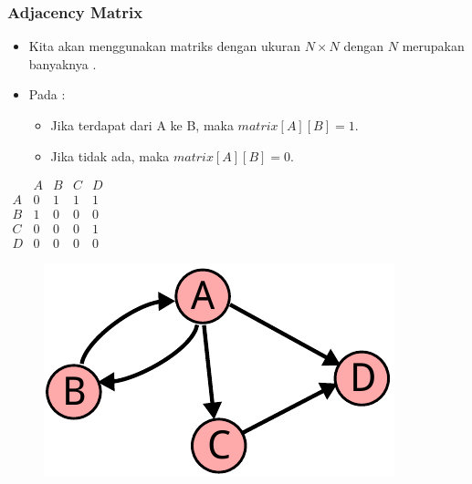 \begin{frame}
\frametitle{Adjacency Matrix}
\begin{itemize}
  \item Kita akan menggunakan matriks dengan ukuran $N \times N$ dengan $N$ merupakan banyaknya \fnode.
  \item Pada  \fgraph:
  \begin{itemize}
    \item Jika terdapat \fedge dari A ke B, maka $matrix[A][B] = 1$. 
    \item Jika tidak ada, maka $matrix[A][B] = 0$.
  \end{itemize}
\end{itemize}

\begin{center}
\begin{multicols}{2}
  $\begin{array}{c|cccc}
      & A & B & C & D \\ \hline
    A & 0 & 1 & 1 & 1 \\
    B & 1 & 0 & 0 & 0 \\
    C & 0 & 0 & 0 & 1 \\
    D & 0 & 0 & 0 & 0
  \end{array}$
  \break
  \begin{figure}
    \includegraphics[width=4 cm]{asset/unweighted-directed.pdf}
  \end{figure}
\end{multicols} 
\end{center}
\end{frame}

